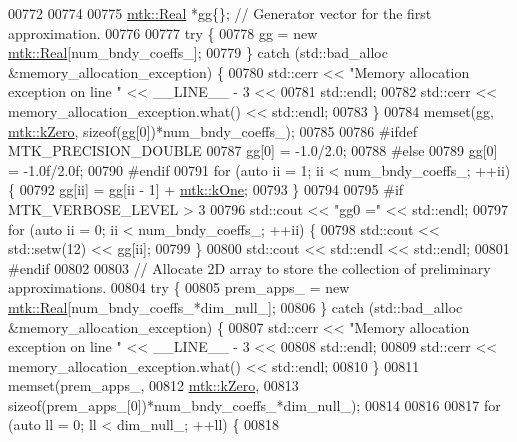 \begin{DoxyCode}
{{00772 
00774 
00775   \hyperlink{group__c01-roots_gac080bbbf5cbb5502c9f00405f894857d}{mtk::Real} *gg\{\}; \textcolor{comment}{// Generator vector for the first approximation.}
00776 
00777   \textcolor{keywordflow}{try} \{
00778     gg = \textcolor{keyword}{new} \hyperlink{group__c01-roots_gac080bbbf5cbb5502c9f00405f894857d}{mtk::Real}[num\_bndy\_coeffs\_];
00779   \} \textcolor{keywordflow}{catch} (std::bad\_alloc &memory\_allocation\_exception) \{
00780     std::cerr << \textcolor{stringliteral}{"Memory allocation exception on line "} << \_\_LINE\_\_ - 3 <<
00781 std::endl;
00782     std::cerr << memory\_allocation\_exception.what() << std::endl;
00783   \}
00784   memset(gg, \hyperlink{group__c01-roots_ga59a451a5fae30d59649bcda274fea271}{mtk::kZero}, \textcolor{keyword}{sizeof}(gg[0])*num\_bndy\_coeffs\_);
00785 
00786 \textcolor{preprocessor}{  #ifdef MTK\_PRECISION\_DOUBLE}
00787   gg[0] = -1.0/2.0;
00788 \textcolor{preprocessor}{  #else}
00789   gg[0] = -1.0f/2.0f;
00790 \textcolor{preprocessor}{  #endif}
00791   \textcolor{keywordflow}{for} (\textcolor{keyword}{auto} ii = 1; ii < num\_bndy\_coeffs\_; ++ii) \{
00792     gg[ii] = gg[ii - 1] + \hyperlink{group__c01-roots_ga26407c24d43b6b95480943340d285c71}{mtk::kOne};
00793   \}
00794 
00795 \textcolor{preprocessor}{  #if MTK\_VERBOSE\_LEVEL > 3}
00796   std::cout << \textcolor{stringliteral}{"gg0 ="} << std::endl;
00797   \textcolor{keywordflow}{for} (\textcolor{keyword}{auto} ii = 0; ii < num\_bndy\_coeffs\_; ++ii) \{
00798     std::cout << std::setw(12) << gg[ii];
00799   \}
00800   std::cout << std::endl << std::endl;
00801 \textcolor{preprocessor}{  #endif}
00802 
00803   \textcolor{comment}{// Allocate 2D array to store the collection of preliminary approximations.}
00804   \textcolor{keywordflow}{try} \{
00805     prem\_apps\_ = \textcolor{keyword}{new} \hyperlink{group__c01-roots_gac080bbbf5cbb5502c9f00405f894857d}{mtk::Real}[num\_bndy\_coeffs\_*dim\_null\_];
00806   \} \textcolor{keywordflow}{catch} (std::bad\_alloc &memory\_allocation\_exception) \{
00807     std::cerr << \textcolor{stringliteral}{"Memory allocation exception on line "} << \_\_LINE\_\_ - 3 <<
00808       std::endl;
00809     std::cerr << memory\_allocation\_exception.what() << std::endl;
00810   \}
00811   memset(prem\_apps\_,
00812          \hyperlink{group__c01-roots_ga59a451a5fae30d59649bcda274fea271}{mtk::kZero},
00813          \textcolor{keyword}{sizeof}(prem\_apps\_[0])*num\_bndy\_coeffs\_*dim\_null\_);
00814 
00816 
00817   \textcolor{keywordflow}{for} (\textcolor{keyword}{auto} ll = 0; ll < dim\_null\_; ++ll) \{
00818 
}}
\end{DoxyCode}
